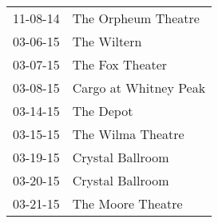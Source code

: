 \begin{supertabular}{p{0.25\columnwidth}p{0.75\columnwidth}}
 11-08-14 &    The Orpheum Theatre \\
 03-06-15 &            The Wiltern \\
 03-07-15 &        The Fox Theater \\
 03-08-15 &  Cargo at Whitney Peak \\
 03-14-15 &              The Depot \\
 03-15-15 &      The Wilma Theatre \\
 03-19-15 &       Crystal Ballroom \\
 03-20-15 &       Crystal Ballroom \\
 03-21-15 &      The Moore Theatre \\
\end{supertabular}
